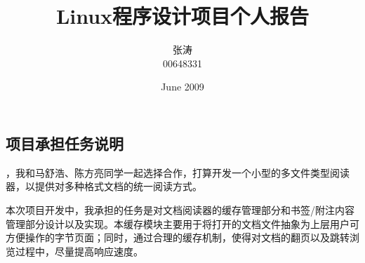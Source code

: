 \documentclass[a4paper,12pt]{article}
\begin{document}
\begin{CJK*}{UTF8}{song}
	
	\newcommand{\chuhao}{\fontsize{42pt}{\baselineskip}\selectfont}
	\newcommand{\xiaochuhao}{\fontsize{36pt}{\baselineskip}\selectfont}
	\newcommand{\yihao}{\fontsize{28pt}{\baselineskip}\selectfont}
	\newcommand{\erhao}{\fontsize{21pt}{\baselineskip}\selectfont}
	\newcommand{\xiaoerhao}{\fontsize{18pt}{\baselineskip}\selectfont}
	\newcommand{\sanhao}{\fontsize{15.75pt}{\baselineskip}\selectfont}
	\newcommand{\sihao}{\fontsize{14pt}{\baselineskip}\selectfont}
	\newcommand{\xiaosihao}{\fontsize{12pt}{1.3\baselineskip}\selectfont}
	\newcommand{\wuhao}{\fontsize{10.5pt}{1.3\baselineskip}\selectfont}
	\newcommand{\xiaowuhao}{\fontsize{9pt}{\baselineskip}\selectfont}
	\newcommand{\liuhao}{\fontsize{7.875pt}{\baselineskip}\selectfont}
	\newcommand{\qihao}{\fontsize{5.25pt}{\baselineskip}\selectfont}

	\title{{\Large{Linux程序设计项目个人报告}}}
	\author{张涛 \\ 00648331}
	\date{June 2009}
	\maketitle

	\section{\large{项目承担任务说明}}
	，我和马舒浩、陈方亮同学一起选择合作，打算开发一个小型的多文件类型阅读器，以提供对多种格式文档的统一阅读方式。

	本次项目开发中，我承担的任务是对文档阅读器的{缓存管理部分}和{书签/附注内容管理部分}设计以及实现。本缓存模块主要用于将打开的文档文件抽象为上层用户可方便操作的字节页面；同时，通过合理的缓存机制，使得对文档的翻页以及跳转浏览过程中，尽量提高响应速度。


\end{CJK*}
\end{document}
